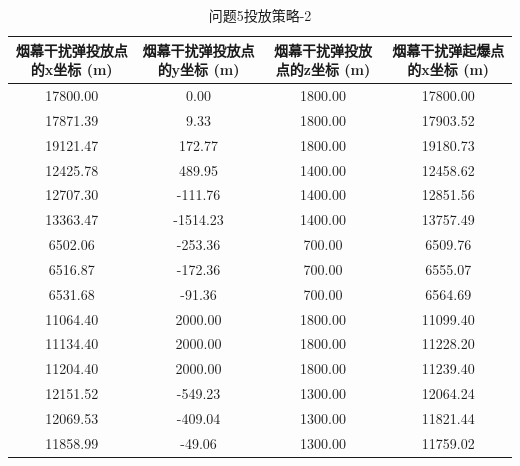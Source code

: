 \documentclass[../main.tex]{subfiles}
\begin{document}
\begin{table}[H]
\caption{问题5投放策略-2}
\label{tab:031} 
\centering
\begin{scriptsize}
\begin{tabular}{cccc}
\toprule[1.5pt]
烟幕干扰弹投放点的x坐标 (m) & 烟幕干扰弹投放点的y坐标 (m) & 烟幕干扰弹投放点的z坐标 (m) & 烟幕干扰弹起爆点的x坐标 (m) \\
\midrule[1pt]
17800.00 & 0.00  & 1800.00 & 17800.00 \\  %
17871.39 & 9.33  & 1800.00 & 17903.52 \\  %
19121.47 & 172.77& 1800.00 & 19180.73 \\  %
12425.78 & 489.95& 1400.00 & 12458.62 \\  %
12707.30 & -111.76&1400.00 & 12851.56 \\  %
13363.47 & -1514.23&1400.00& 13757.49 \\  %
6502.06  & -253.36&700.00  & 6509.76  \\  %
6516.87  & -172.36&700.00  & 6555.07  \\  %
6531.68  & -91.36 &700.00  & 6564.69  \\  %
11064.40 & 2000.00&1800.00 & 11099.40 \\  %
11134.40 & 2000.00&1800.00 & 11228.20 \\  %
11204.40 & 2000.00&1800.00 & 11239.40 \\  %
12151.52 & -549.23&1300.00 & 12064.24 \\  %
12069.53 & -409.04&1300.00 & 11821.44 \\  %
11858.99 & -49.06 &1300.00 & 11759.02 \\  %
\bottomrule[1.5pt]
\end{tabular}
\end{scriptsize}
\end{table}
\end{document}

